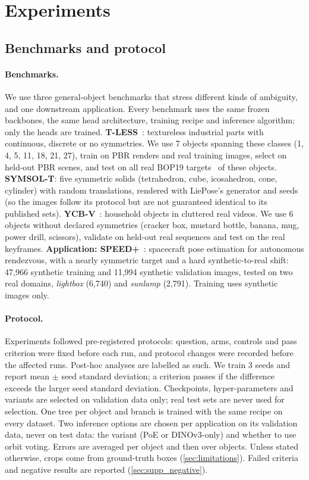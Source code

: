 \section{Experiments}
\label{sec:experiments}

\subsection{Benchmarks and protocol}
\label{sec:setup}
\paragraph{Benchmarks.} We use three general-object benchmarks that stress different kinds of ambiguity, and one downstream application. Every benchmark uses the same frozen backbones, the same head architecture, training recipe and inference algorithm; only the heads are trained.
\textbf{T-LESS}~\cite{hodan2017tless}: textureless industrial parts with continuous, discrete or no symmetries. We use 7 objects spanning these classes (1, 4, 5, 11, 18, 21, 27), train on PBR renders and real training images, select on held-out PBR scenes, and test on all real BOP19 targets~\cite{hodan2020bop} of these objects.
\textbf{SYMSOL-T}: five symmetric solids (tetrahedron, cube, icosahedron, cone, cylinder) with random translations, rendered with LiePose's generator and seeds~\cite{hsiao2024liepose} (so the images follow its protocol but are not guaranteed identical to its published sets).
\textbf{YCB-V}~\cite{xiang2018posecnn}: household objects in cluttered real videos. We use 6 objects without declared symmetries (cracker box, mustard bottle, banana, mug, power drill, scissors), validate on held-out real sequences and test on the real keyframes.
\textbf{Application: SPEED+}~\cite{park2022speedplus}: spacecraft pose estimation for autonomous rendezvous, with a nearly symmetric target and a hard synthetic-to-real shift: 47,966 synthetic training and 11,994 synthetic validation images, tested on two real domains, \emph{lightbox} (6,740) and \emph{sunlamp} (2,791). Training uses synthetic images only.

\paragraph{Protocol.} Experiments followed pre-registered protocols: question, arms, controls and pass criterion were fixed before each run, and protocol changes were recorded before the affected runs. Post-hoc analyses are labelled as such. We train 3 seeds and report mean $\pm$ seed standard deviation; a criterion passes if the difference exceeds the larger seed standard deviation. Checkpoints, hyper-parameters and variants are selected on validation data only; real test sets are never used for selection. One tree per object and branch is trained with the same recipe on every dataset. Two inference options are chosen per application on its validation data, never on test data: the variant (PoE or DINOv3-only) and whether to use orbit voting. Errors are averaged per object and then over objects. Unless stated otherwise, crops come from ground-truth boxes (\cref{sec:limitations}). Failed criteria and negative results are reported (\cref{sec:supp_negative}).

